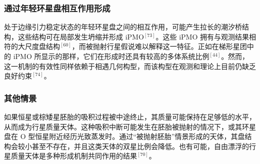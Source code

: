 \subsubsection{通过年轻环星盘相互作用形成}
处于边缘引力稳定状态的年轻环星盘之间的相互作用，可能产生拉长的潮汐桥结构，这些结构可在局部发生坍缩并形成 iPMO$^{[73]}$。这些 iPMO 拥有与观测结果相符的大尺度盘结构$^{[60]}$，而被抛射行星假说难以解释这一特征。正如在梯形星团中的 iPMO 所显示的那样，它们在形成时还具有较高的多体系统比例$^{[44]}$。然而，这一机制的有效性同样依赖于相遇几何构型，而该构型在观测和理论上目前仍缺乏良好约束$^{[74]}$。
\subsubsection{其他情景}
如果恒星或棕矮星胚胎的吸积过程被中途终止，其质量可能保持在足够低的水平，从而成为行星质量天体。这种吸积中断可能发生在胚胎被抛射的情况下，或其环星盘在 O 型恒星附近经历光致蒸发时。通过“被抛射胚胎”情景形成的天体，其盘结构会较小甚至不存在，并且这类天体的双星比例会降低。也有可能，自由漂浮的行星质量天体是多种形成机制共同作用的结果$^{[70]}$。
